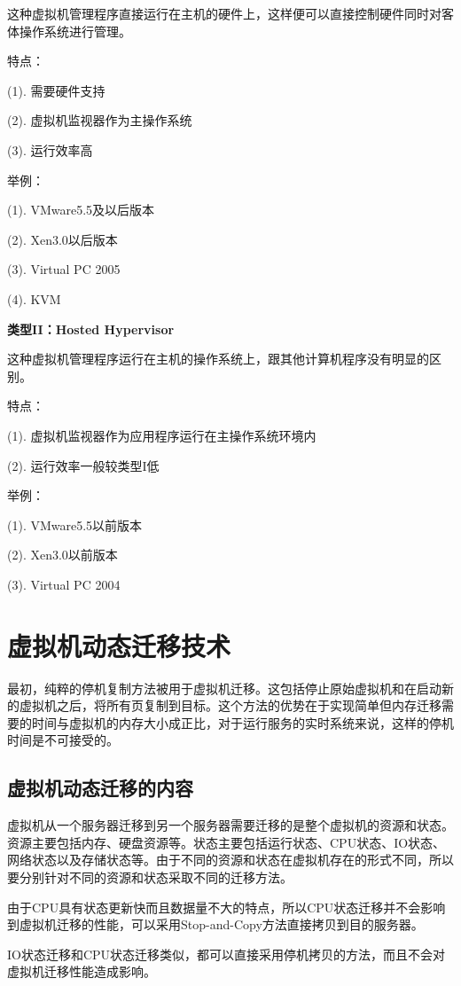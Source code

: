 这种虚拟机管理程序直接运行在主机的硬件上，这样便可以直接控制硬件同时对客体操作系统进行管理。

特点：

    (1). 需要硬件支持

    (2). 虚拟机监视器作为主操作系统

    (3). 运行效率高

举例：

    (1). VMware5.5及以后版本

    (2). Xen3.0以后版本

    (3). Virtual PC 2005

    (4). KVM

\textbf{类型II：Hosted Hypervisor}

这种虚拟机管理程序运行在主机的操作系统上，跟其他计算机程序没有明显的区别。

特点：

    (1). 虚拟机监视器作为应用程序运行在主操作系统环境内

    (2). 运行效率一般较类型I低

举例：

    (1). VMware5.5以前版本

    (2). Xen3.0以前版本
    
    (3). Virtual PC 2004

\section{虚拟机动态迁移技术}
最初，纯粹的停机复制方法被用于虚拟机迁移。这包括停止原始虚拟机和在启动新的虚拟机之后，将所有页复制到目标。这个方法的优势在于实现简单但内存迁移需要的时间与虚拟机的内存大小成正比，对于运行服务的实时系统来说，这样的停机时间是不可接受的。

\subsection{虚拟机动态迁移的内容}
虚拟机从一个服务器迁移到另一个服务器需要迁移的是整个虚拟机的资源和状态。资源主要包括内存、硬盘资源等。状态主要包括运行状态、CPU状态、IO状态、网络状态以及存储状态等。由于不同的资源和状态在虚拟机存在的形式不同，所以要分别针对不同的资源和状态采取不同的迁移方法。

由于CPU具有状态更新快而且数据量不大的特点，所以CPU状态迁移并不会影响到虚拟机迁移的性能，可以采用Stop-and-Copy方法直接拷贝到目的服务器。

IO状态迁移和CPU状态迁移类似，都可以直接采用停机拷贝的方法，而且不会对虚拟机迁移性能造成影响。

